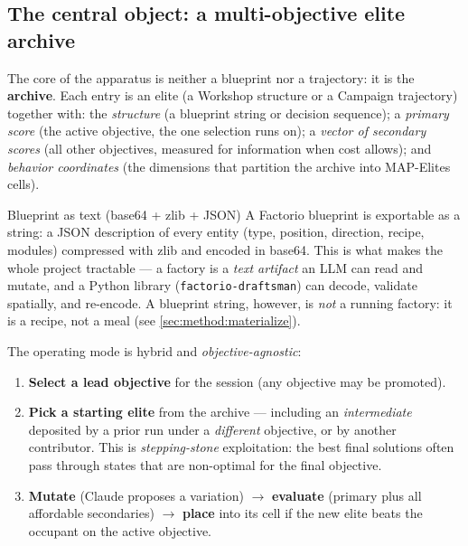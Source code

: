 \documentclass[11pt,a4paper]{article}
\begin{document}
\subsection{The central object: a multi-objective elite archive}

The core of the apparatus is neither a blueprint nor a trajectory: it is the
\textbf{archive}. Each entry is an elite (a Workshop structure or a Campaign
trajectory) together with: the \emph{structure} (a blueprint string or decision
sequence); a \emph{primary score} (the active objective, the one selection runs
on); a \emph{vector of secondary scores} (all other objectives, measured for
information when cost allows); and \emph{behavior coordinates} (the dimensions
that partition the archive into MAP-Elites cells).

\begin{notionbox}{Blueprint as text (base64 + zlib + JSON)}
A Factorio blueprint is exportable as a string: a JSON description of every
entity (type, position, direction, recipe, modules) compressed with zlib and
encoded in base64. This is what makes the whole project tractable --- a factory is
a \emph{text artifact} an LLM can read and mutate, and a Python library
(\texttt{factorio-draftsman}) can decode, validate spatially, and re-encode. A
blueprint string, however, is \emph{not} a running factory: it is a recipe, not a
meal (see \cref{sec:method:materialize}).
\end{notionbox}

The operating mode is hybrid and \emph{objective-agnostic}:
\begin{enumerate}
\item \textbf{Select a lead objective} for the session (any objective may be
  promoted).
\item \textbf{Pick a starting elite} from the archive --- including an
  \emph{intermediate} deposited by a prior run under a \emph{different}
  objective, or by another contributor. This is \emph{stepping-stone}
  exploitation: the best final solutions often pass through states that are
  non-optimal for the final objective.
\item \textbf{Mutate} (Claude proposes a variation) $\rightarrow$
  \textbf{evaluate} (primary plus all affordable secondaries) $\rightarrow$
  \textbf{place} into its cell if the new elite beats the occupant on the active
  objective.
\end{enumerate}
\end{document}
